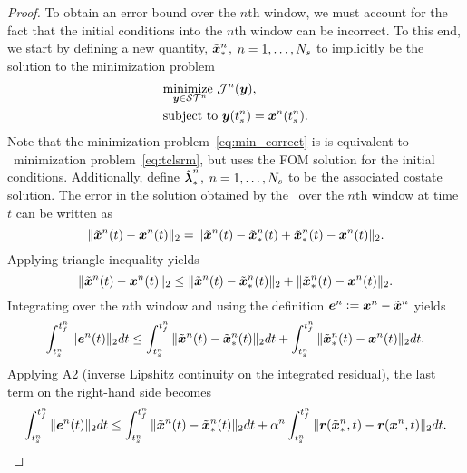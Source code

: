 \begin{proof}
To obtain an error bound over the $n$th window, we must account for the 
fact that the initial conditions into the $n$th window can be incorrect. To this end, 
we start by defining a new quantity, $\tilde{\boldsymbol x}_{*}^{n}$, $n=1,\ldots,N_s$ to implicitly be the solution to the minimization problem 
\begin{equation}\label{eq:min_correct}
\begin{split}
& \underset{\boldsymbol y \in \mathcal{ ST }^{n}}{\text{minimize } }
\mathcal{J}^{n}(\boldsymbol y),\\
& \text{subject to } \boldsymbol y(t_s^{n})= {\boldsymbol x}^{n}(t_s^{n}).
\end{split}
\end{equation}
Note that the minimization problem~\eqref{eq:min_correct} is is equivalent to \methodAcronym\ minimization problem~\eqref{eq:tclsrm}, but uses the FOM solution for the initial conditions. 
Additionally, define $\hat{\boldsymbol \lambda}_*^{n}$, $n=1,\ldots,N_s$ to be the associated costate solution.
 The error in the solution obtained by the 
\methodAcronymROM\ over the $n$th window at time $t$ can be written as
\begin{equation*}
\|  \tilde{\boldsymbol x}^{n}(t) - {\boldsymbol x}^{n}(t) \|_2 = 
\| \tilde{\boldsymbol x}^{n}(t) - \tilde{\boldsymbol x}_{*}^{n}(t) + \tilde{\boldsymbol x}_{*}^{n}(t) -  {\boldsymbol x}^{n}(t)  \|_2.
\end{equation*}
Applying triangle inequality yields
\begin{equation*}
\|  \tilde{\boldsymbol x}^{n}(t) - {\boldsymbol x}^{n}(t) \|_2 \le 
\| \tilde{\boldsymbol x}^{n}(t) - \tilde{\boldsymbol x}_{*}^{n}(t) \|_2 + \|  \tilde{\boldsymbol x}_{*}^{n}(t) -  {\boldsymbol x}^{n}(t)  \|_2.
\end{equation*}
Integrating over the $n$th window and using the definition $\boldsymbol e^{n} \vcentcolon= {\boldsymbol x}^{n} - \tilde{\boldsymbol x}^{n}$ yields
$$\int_{t_s^{n}}^{t_f^{n}} \| \boldsymbol e^{n}(t) \|_2 dt \le \int_{t_s^{n}}^{t_f^{n}} \| \tilde{\boldsymbol x}^{n}(t) - \tilde{\boldsymbol x}_{*}^{n}(t) \|_2 dt +  \int_{t_s^{n}}^{t_f^{n}} \| \tilde{\boldsymbol x}_{*}^{n}(t) - {\boldsymbol x}^{n}(t) \|_2dt.$$
Applying A2 (inverse Lipshitz continuity on the integrated residual), the last term on the right-hand side becomes
\begin{equation*}
\intSlabArg{n} \norm{\errorArgt{n}{t}} dt \le \intSlabArg{n} \norm{\stateROMSolArgt{n}{t} - \stateROMStarSolArgt{n}{t}} dt +  \lipshitziArg{n} \intSlabArg{n} \norm{ \resid(\stateROMStarSolArg{n},t) - \resid(\stateFOMSolArg{n},t)} dt.

\end{equation*}
\end{proof}
